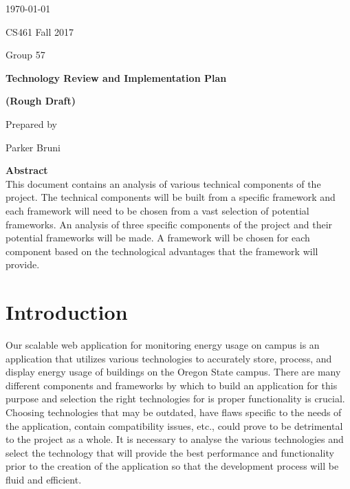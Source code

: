 \documentclass[onecolumn, draftclsnofoot,10pt, compsoc]{IEEEtran}
\newcommand{\NameSigPair}[1]{\par
\makebox[2.75in][r]{#1} \hfil 	\makebox[3.25in]{\makebox[2.25in]{\hrulefill} \hfill		\makebox[.75in]{\hrulefill}}
\par\vspace{-12pt} \textit{\tiny\noindent
\makebox[2.75in]{} \hfil		\makebox[3.25in]{\makebox[2.25in][r]{Signature} \hfill	\makebox[.75in][r]{Date}}}}
\renewcommand{\NameSigPair}[1]{#1}
\begin{document}
\begin{titlepage}
    \begin{singlespace}
        \hfill 
        \par\vspace{.2in}
        \centering
        \scshape{
            {\large\today}\par
			{\large CS461 Fall 2017}\par
			{\large Group 57}\par
            \vspace{2.5in}
            \textbf{\Huge{Technology Review and Implementation Plan}}\par
			\textbf{\Huge{(Rough Draft)}}\par
            \vspace{2.5in}
            {\large Prepared by }\par
            \vspace{5pt}
            {\Large
                \NameSigPair{Parker Bruni}\par
			\vfill
			\textbf{Abstract} \\
            \indent 
				This document contains an analysis of various technical components of the project. The technical components will be built from a specific 
				framework and each framework will need to be chosen from a vast selection of potential frameworks. An analysis of three specific components
				of the project and their potential frameworks will be made. A framework will be chosen for each component based on the 
				technological advantages that the framework will provide. 
            }
            \vspace{20pt}
        }
      
    \end{singlespace}
\end{titlepage}
\newpage
{}


\section{Introduction}
	
	Our scalable web application for monitoring energy usage on campus is an application that utilizes various technologies to accurately store, process, and display
	energy usage of buildings on the Oregon State campus. There are many different components and frameworks by which to build an application for this purpose and
	selection the right technologies for is proper functionality is crucial. Choosing technologies that may be outdated, have flaws specific to the needs of the application, contain
	compatibility issues, etc., could prove to be detrimental to the project as a whole. It is necessary to analyse the various technologies and select
	the technology that will provide the best performance and functionality prior to the creation of the application so that the development process will be fluid and efficient. 
	
\end{document}
